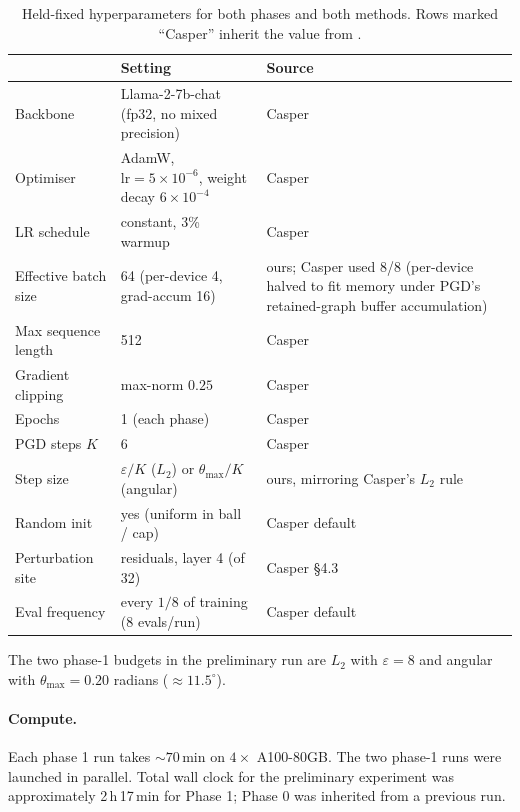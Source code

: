 \documentclass[11pt]{article}
\newcommand{\thmax}{\theta_{\max}}
\newcommand{\eps}{\varepsilon}
\begin{document}
\begin{table}[h]
\centering
\small
\begin{tabular}{l l p{}}
\toprule
& \textbf{Setting} & \textbf{Source} \\
\midrule
Backbone & Llama-2-7b-chat (fp32, no mixed precision) & Casper \\
Optimiser & AdamW, $\text{lr} = 5\!\times\!10^{-6}$, weight decay $6\!\times\!10^{-4}$ & Casper \\
LR schedule & constant, 3\% warmup & Casper \\
Effective batch size & 64 (per-device 4, grad-accum 16) & ours; Casper used 8/8 (per-device halved to fit memory under PGD's retained-graph buffer accumulation) \\
Max sequence length & 512 & Casper \\
Gradient clipping & max-norm $0.25$ & Casper \\
Epochs & 1 (each phase) & Casper \\
PGD steps $K$ & 6 & Casper \\
Step size & $\eps / K$ ($L_2$) or $\thmax / K$ (angular) & ours, mirroring Casper's $L_2$ rule \\
Random init & yes (uniform in ball / cap) & Casper default \\
Perturbation site & residuals, layer 4 (of 32) & Casper §4.3 \\
Eval frequency & every $1/8$ of training (8 evals/run) & Casper default \\
\bottomrule
\end{tabular}
\caption{Held-fixed hyperparameters for both phases and both methods. Rows marked ``Casper'' inherit the value from \citet{casper2024lat}.}
\label{tab:hyperparams}
\end{table}

The two phase-1 budgets in the preliminary run are $L_2$ with $\eps = 8$ and angular with $\thmax = 0.20$ radians ($\approx 11.5^\circ$).

\paragraph{Compute.} Each phase 1 run takes $\sim 70$\,min on $4 \times$ A100-80GB. The two phase-1 runs were launched in parallel. Total wall clock for the preliminary experiment was approximately 2\,h\,17\,min for Phase 1; Phase 0 was inherited from a previous run.
\end{document}
